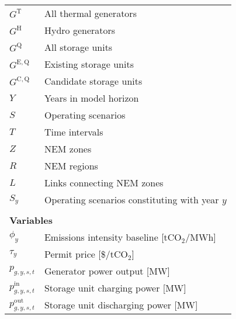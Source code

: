 \documentclass{article}
\newcommand{\sGeneratorsThermal}{G^{\mathrm{T}}}
\newcommand{\sGeneratorsHydro}{G^{\mathrm{H}}}
\newcommand{\sStorage}{G^{\mathrm{Q}}}
\newcommand{\sStorageExisting}{G^{\mathrm{E,Q}}}
\newcommand{\sStorageCandidate}{G^{\mathrm{C,Q}}}
\newcommand{\sYears}{Y}
\newcommand{\sScenarios}{S}
\newcommand{\sIntervals}{T}
\newcommand{\sZones}{Z}
\newcommand{\sRegions}{R}
\newcommand{\sLinks}{L}
\newcommand{\sScenariosYear}{\sScenarios_{\iYear}}
\newcommand{\iGenerator}{g}
\newcommand{\iYear}{y}
\newcommand{\iScenario}{s}
\newcommand{\iInterval}{t}
\newcommand{\vBaseline}[1][\iYear]{\phi_{#1}}
\newcommand{\vPermitPrice}[1][\iYear]{\tau_{#1}}
\newcommand{\vPower}[1][\iGenerator,\iYear,\iScenario,\iInterval]{p_{#1}}
\newcommand{\vPowerTotal}[1][\iGenerator,\iYear,\iScenario,\iInterval]{\hat{p}_{#1}}
\newcommand{\vPowerIn}[1][\iGenerator,\iYear,\iScenario,\iInterval]{p^{\mathrm{in}}_{#1}}
\newcommand{\vPowerOut}[1][\iGenerator,\iYear,\iScenario,\iInterval]{p^{\mathrm{out}}_{#1}}
\begin{document}
\begin{longtable}{ p{}  p{}}
		$\sGeneratorsThermal$ & All thermal generators\\
		$\sGeneratorsHydro$ & Hydro generators\\
		$\sStorage$ & All storage units\\
		$\sStorageExisting$ & Existing storage units\\
		$\sStorageCandidate$ & Candidate storage units\\
		$\sYears$ & Years in model horizon\\
		$\sScenarios$ & Operating scenarios\\
		$\sIntervals$ & Time intervals\\
		$\sZones$ & NEM zones\\
		$\sRegions$ & NEM regions\\
		$\sLinks$ & Links connecting NEM zones\\
		$\sScenariosYear$ & Operating scenarios constituting with year $\iYear$\\
		& \\
		\multicolumn{2}{l}{\textbf{Variables}}\\
		$\vBaseline$ & Emissions intensity baseline [tCO$_{2}$/MWh]\\
		$\vPermitPrice$ & Permit price [\$/tCO$_{2}$]\\
		$\vPower$ & Generator power output [MW]\\
		$\vPowerIn$ & Storage unit charging power [MW]\\
		$\vPowerOut$ & Storage unit discharging power [MW]\\

\end{longtable}
\end{document}
